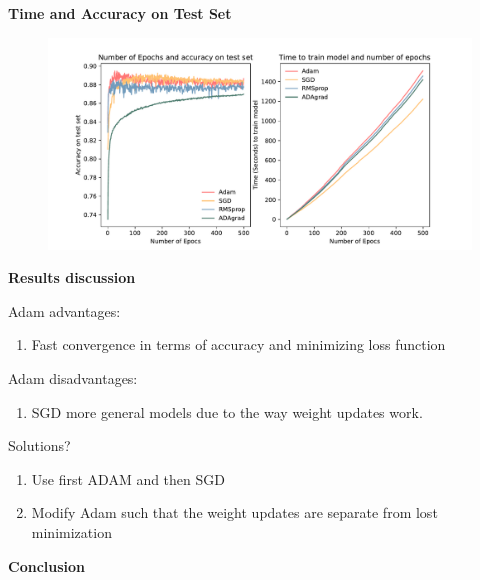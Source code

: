 \documentclass{beamer}
\newcommand\myheading[1]{%
  \par\bigskip
  {\Large\bfseries#1}\par\smallskip}
\begin{document}
\begin{frame}
 \myheading{Time and Accuracy on Test Set}
    \begin{figure}[h]
        \includegraphics[width=12cm]{report/figures/time_and_accuracy.pdf}
    \end{figure}
\end{frame}
\begin{frame}
    \myheading{Results discussion}
    Adam advantages:
    \begin{enumerate}
        \item Fast convergence in terms of accuracy and minimizing loss function
    \end{enumerate}
    Adam disadvantages: 
    \begin{enumerate}
        \item SGD more general models due to the way weight updates work. 
    \end{enumerate}
    Solutions? 
    \begin{enumerate}
        \item Use first ADAM and then SGD
        \item Modify Adam such that the weight updates are separate from lost minimization
    \end{enumerate}
\end{frame}

\begin{frame}
    \myheading{Conclusion}
\end{frame}
\end{document}
